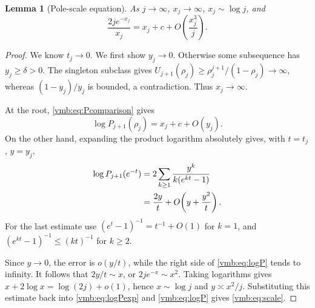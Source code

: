\documentclass[11pt,a4paper]{article}
\numberwithin{equation}{section}
\newtheorem{lemma}[theorem]{Lemma}
\theoremstyle{definition}\newtheorem{definition}[theorem]{Definition}
\theoremstyle{remark}\newtheorem{remark}[theorem]{Remark}
\begin{document}
\begin{lemma}[Pole-scale equation]\label{vmb:lem:scale}
As \(j\to\infty\), \(x_j\to\infty\), \(x_j\sim\log j\), and
\begin{equation}\label{vmb:eq:scale}
\frac{2j e^{-x_j}}{x_j}
=x_j+c+O\!\left(\frac{x_j^3}{j}\right).
\end{equation}
\end{lemma}
\begin{proof}
We know \(t_j\to0\). We first show \(y_j\to0\). Otherwise some
subsequence has \(y_j\geq\delta>0\). The singleton subclass gives
\(U_{j+1}(\rho_j)\geq\rho_j^{j+1}/(1-\rho_j)\to\infty\),
whereas \((1-y_j)/y_j\) is bounded, a contradiction.
Thus \(x_j\to\infty\).

At the root, \eqref{vmb:eq:Pcomparison} gives
\begin{equation}\label{vmb:eq:logP}
\log P_{j+1}(\rho_j)=x_j+c+O(y_j).
\end{equation}
On the other hand, expanding the product logarithm absolutely gives,
with \(t=t_j\), \(y=y_j\),
\begin{align}
\log P_{j+1}(e^{-t})
 &=2\sum_{k\geq1}\frac{y^k}{k(e^{kt}-1)}\notag\\
 &=\frac{2y}{t}+O\!\left(y+\frac{y^2}{t}\right).
\label{vmb:eq:logPexp}
\end{align}
For the last estimate use
\((e^t-1)^{-1}=t^{-1}+O(1)\) for \(k=1\), and
\((e^{kt}-1)^{-1}\leq(kt)^{-1}\) for \(k\geq2\).

Since \(y\to0\), the error is \(o(y/t)\), while the right side of
\eqref{vmb:eq:logP} tends to infinity. It follows that
\(2y/t\sim x\), or \(2j e^{-x}\sim x^2\). Taking logarithms gives
\(x+2\log x=\log(2j)+o(1)\), hence \(x\sim\log j\) and
\(y\asymp x^2/j\). Substituting this estimate back into
\eqref{vmb:eq:logPexp} and \eqref{vmb:eq:logP} gives \eqref{vmb:eq:scale}.
\end{proof}
\end{document}
